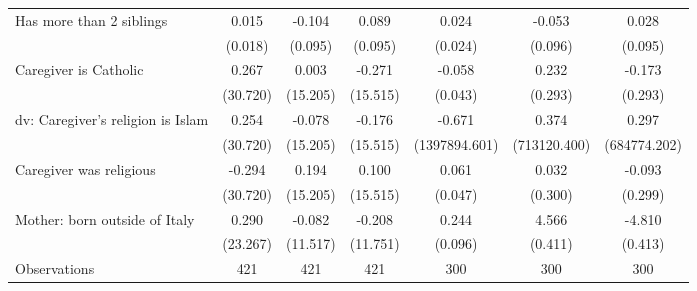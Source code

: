 {\begin{tabular}{l*{6}{c}}
\addlinespace
Has more than 2 siblings&       0.015         &      -0.104         &       0.089         &       0.024         &      -0.053         &       0.028         \\
                    &     (0.018)         &     (0.095)         &     (0.095)         &     (0.024)         &     (0.096)         &     (0.095)         \\
\addlinespace
Caregiver is Catholic&       0.267         &       0.003         &      -0.271         &      -0.058         &       0.232         &      -0.173         \\
                    &    (30.720)         &    (15.205)         &    (15.515)         &     (0.043)         &     (0.293)         &     (0.293)         \\
\addlinespace
dv: Caregiver's religion is Islam&       0.254         &      -0.078         &      -0.176         &      -0.671         &       0.374         &       0.297         \\
                    &    (30.720)         &    (15.205)         &    (15.515)         &(1397894.601)         &(713120.400)         &(684774.202)         \\
\addlinespace
Caregiver was religious&      -0.294         &       0.194         &       0.100         &       0.061         &       0.032         &      -0.093         \\
                    &    (30.720)         &    (15.205)         &    (15.515)         &     (0.047)         &     (0.300)         &     (0.299)         \\
\addlinespace
Mother: born outside of Italy&       0.290         &      -0.082         &      -0.208         &       0.244\sym{*}  &       4.566\sym{***}&      -4.810\sym{***}\\
                    &    (23.267)         &    (11.517)         &    (11.751)         &     (0.096)         &     (0.411)         &     (0.413)         \\
\midrule
Observations        &         421         &         421         &         421         &         300         &         300         &         300         \\
\bottomrule
\end{tabular}
}
